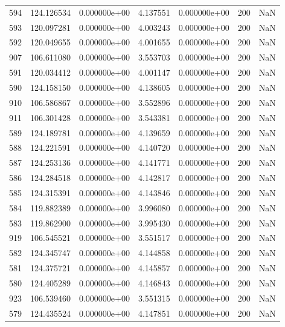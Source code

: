 \begin{tabular}{rrrrrrr}
 594 & 124.126534 &  0.000000e+00 &  4.137551 &  0.000000e+00 &         200 & NaN \\
 593 & 120.097281 &  0.000000e+00 &  4.003243 &  0.000000e+00 &         200 & NaN \\
 592 & 120.049655 &  0.000000e+00 &  4.001655 &  0.000000e+00 &         200 & NaN \\
 907 & 106.611080 &  0.000000e+00 &  3.553703 &  0.000000e+00 &         200 & NaN \\
 591 & 120.034412 &  0.000000e+00 &  4.001147 &  0.000000e+00 &         200 & NaN \\
 590 & 124.158150 &  0.000000e+00 &  4.138605 &  0.000000e+00 &         200 & NaN \\
 910 & 106.586867 &  0.000000e+00 &  3.552896 &  0.000000e+00 &         200 & NaN \\
 911 & 106.301428 &  0.000000e+00 &  3.543381 &  0.000000e+00 &         200 & NaN \\
 589 & 124.189781 &  0.000000e+00 &  4.139659 &  0.000000e+00 &         200 & NaN \\
 588 & 124.221591 &  0.000000e+00 &  4.140720 &  0.000000e+00 &         200 & NaN \\
 587 & 124.253136 &  0.000000e+00 &  4.141771 &  0.000000e+00 &         200 & NaN \\
 586 & 124.284518 &  0.000000e+00 &  4.142817 &  0.000000e+00 &         200 & NaN \\
 585 & 124.315391 &  0.000000e+00 &  4.143846 &  0.000000e+00 &         200 & NaN \\
 584 & 119.882389 &  0.000000e+00 &  3.996080 &  0.000000e+00 &         200 & NaN \\
 583 & 119.862900 &  0.000000e+00 &  3.995430 &  0.000000e+00 &         200 & NaN \\
 919 & 106.545521 &  0.000000e+00 &  3.551517 &  0.000000e+00 &         200 & NaN \\
 582 & 124.345747 &  0.000000e+00 &  4.144858 &  0.000000e+00 &         200 & NaN \\
 581 & 124.375721 &  0.000000e+00 &  4.145857 &  0.000000e+00 &         200 & NaN \\
 580 & 124.405289 &  0.000000e+00 &  4.146843 &  0.000000e+00 &         200 & NaN \\
 923 & 106.539460 &  0.000000e+00 &  3.551315 &  0.000000e+00 &         200 & NaN \\
 579 & 124.435524 &  0.000000e+00 &  4.147851 &  0.000000e+00 &         200 & NaN \\

\end{tabular}

